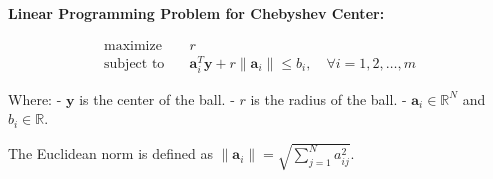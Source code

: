 \documentclass{article}
\begin{document}
\textbf{Linear Programming Problem for Chebyshev Center:}

\begin{align*}
    \text{maximize} \quad & r \\
    \text{subject to} \quad & \mathbf{a}_i^T \mathbf{y} + r \|\mathbf{a}_i\| \leq b_i, \quad \forall i = 1, 2, \ldots, m 
\end{align*}

Where:
- \( \mathbf{y} \) is the center of the ball.
- \( r \) is the radius of the ball.
- \( \mathbf{a}_i \in \mathbb{R}^N \) and \( b_i \in \mathbb{R} \).

The Euclidean norm is defined as \( \|\mathbf{a}_i\| = \sqrt{\sum_{j=1}^{N} a_{ij}^2} \).
\end{document}
